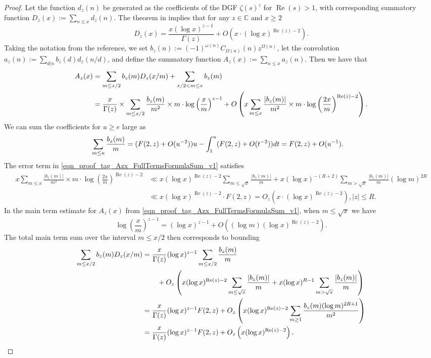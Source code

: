\documentclass[11pt,reqno,a4letter]{article}
\numberwithin{figure}{section}
\numberwithin{table}{section}
\theoremstyle{plain}
\numberwithin{theorem}{section}
\theoremstyle{definition}
\renewcommand{\Re}{\operatorname{Re}}
\begin{document}
\begin{proof}
Let the function $d_z(n)$ be generated as the coefficients of the DGF 
$\zeta(s)^{z}$ for $\Re(s) > 1$, with corresponding 
summatory function $D_z(x) := \sum_{n \leq x} d_z(n)$. 
The theorem in \cite[Thm.\ 7.17; \S 7.4]{MV} implies that for any $z \in \mathbb{C}$ and $x \geq 2$ 
\[
D_z(x) = \frac{x (\log x)^{z-1}}{\Gamma(z)} + O\left(x \cdot (\log x)^{\Re(z)-2}\right). 
\]
Taking the notation from the reference, we set 
$b_z(n) := (-1)^{\omega(n)} C_{\Omega(n)}(n) z^{\Omega(n)}$, let the convolution 
$a_z(n) := \sum_{d|n} b_z(d) d_z(n/d)$, and define the summatory function 
$A_z(x) := \sum_{n \leq x} a_z(n)$. 
Then we have that 
\begin{align} 
\notag 
A_z(x) & = \sum_{m \leq x/2} b_z(m) D_z(x/m) + \sum_{x/2 < m \leq x} b_z(m) \\ 
\label{eqn_proof_tag_Azx_FullTermsFormulaSum_v1} 
     & = \frac{x}{\Gamma(z)} \times \sum_{m \leq x/2} 
     \frac{b_z(m)}{m^2} \times m \cdot \log\left(\frac{x}{m}\right)^{z-1} + 
     O\left(x \sum_{m \leq x} \frac{|b_z(m)|}{m^2} \times m \cdot 
     \log\left(\frac{2x}{m}\right)^{\Re(z) - 2}\right). 
\end{align} 
We can sum the coefficients for $u \geq e$ large as 
\begin{align} 
\notag 
\sum_{m \leq u} \frac{b_z(m)}{m} & = (F(2, z) + O(u^{-2})) u - \int_1^{u} 
     (F(2, z) + O(t^{-2})) dt 
     = F(2, z) + O(u^{-1}). 
\end{align} 
The error term in \eqref{eqn_proof_tag_Azx_FullTermsFormulaSum_v1} satisfies 
\begin{align*} 
x \sum_{m \leq x} \frac{|b_z(m)|}{m^2} \times m \cdot 
     \log\left(\frac{2x}{m}\right)^{\Re(z) - 2} & \ll 
     x (\log x)^{\Re(z) - 2} \sum_{m \leq \sqrt{x}} \frac{|b_z(m)|}{m} + 
     x (\log x)^{-(R+2)} \sum_{m > \sqrt{x}} \frac{|b_z(m)|}{m} (\log m)^{2R} \\ 
     & \ll x (\log x)^{\Re(z) - 2} \cdot F(2, z) 
     = O_z\left(x \cdot (\log x)^{\Re(z) - 2}\right), |z| \leq R. 
\end{align*} 
In the main term estimate for $A_z(x)$ from 
\eqref{eqn_proof_tag_Azx_FullTermsFormulaSum_v1}, when $m \leq \sqrt{x}$ we have 
\[
\log\left(\frac{x}{m}\right)^{z-1} = (\log x)^{z-1} + 
     O\left((\log m) (\log x)^{\Re(z) - 2}\right). 
\]
The total main term sum over the interval $m \leq x/2$ then corresponds to bounding 
\begin{align*} 
\sum_{m \leq x/2} b_z(m) D_z(x/m) & = \frac{x}{\Gamma(z)} (\log x)^{z-1} 
     \sum_{m \leq x/2} \frac{b_z(m)}{m} \\ 
     & \phantom{=\quad\ } + 
     O_z\left(x (\log x)^{\Re(z)-2} \sum_{m \leq \sqrt{x}} \frac{|b_z(m)|}{m} + 
     x (\log x)^{R-1} \sum_{m > \sqrt{x}} \frac{|b_z(m)|}{m}\right) \\ 
     & = \frac{x}{\Gamma(z)} (\log x)^{z-1} F(2, z) + O_z\left( 
     x (\log x)^{\Re(z)-2} \sum_{m \geq 1} \frac{b_z(m) (\log m)^{2R+1}}{m^2} 
     \right) \\ 
     & = \frac{x}{\Gamma(z)} (\log x)^{z-1} F(2, z) + O_z\left( 
     x (\log x)^{\Re(z)-2}\right). 
     \qedhere  
\end{align*} 
\end{proof} 
\end{document}
